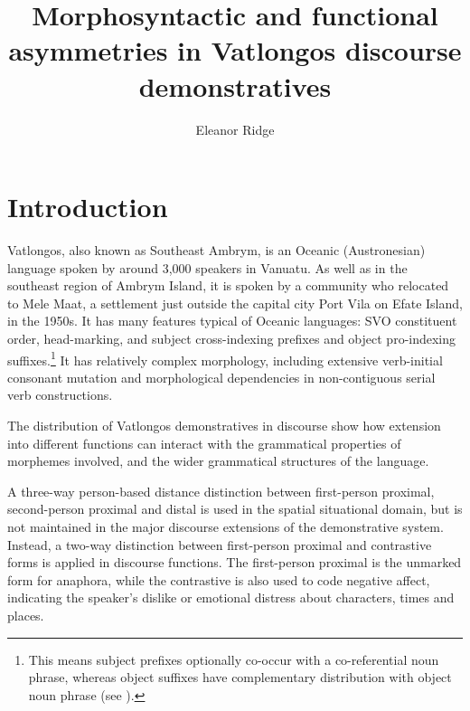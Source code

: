 \documentclass[output=paper,colorlinks,citecolor=brown]{langscibook}
\author{Eleanor Ridge\affiliation{Massey University}\orcid{}}
\title{Morphosyntactic and functional asymmetries in Vatlongos discourse demonstratives}
\begin{document}
\maketitle
{}


\section{Introduction}
\label{sec:ridge:1}

Vatlongos, also known as Southeast Ambrym, is an Oceanic (Austronesian) language spoken by around 3,000 speakers in Vanuatu. As well as in the southeast region of Ambrym Island, it is spoken by a community who relocated to Mele Maat, a settlement just outside the capital city Port Vila on Efate Island, in the 1950s. It has many features typical of Oceanic languages: SVO constituent order, head-marking, and subject cross-indexing prefixes and object pro-indexing suffixes.\footnote{This means subject prefixes optionally co-occur with a co-referential noun phrase, whereas object suffixes have complementary distribution with object noun phrase (see \citealt{Haspelmath2013}).}  It has relatively complex morphology, including extensive verb-initial consonant mutation and morphological dependencies in non-contiguous serial verb constructions.

The distribution of Vatlongos demonstratives in discourse show how extension into different functions can interact with the grammatical properties of morphemes involved, and the wider grammatical structures of the language.

A three-way person-based distance distinction between first-person proximal, second-person proximal and distal is used in the spatial situational domain, but is not maintained in the major discourse extensions of the demonstrative system. Instead, a two-way distinction between first-person proximal and contrastive forms is applied in discourse functions. The first-person proximal is the unmarked form for anaphora, while the contrastive is also used to code negative affect, indicating the speaker’s dislike or emotional distress about characters, times and places.
\end{document}
